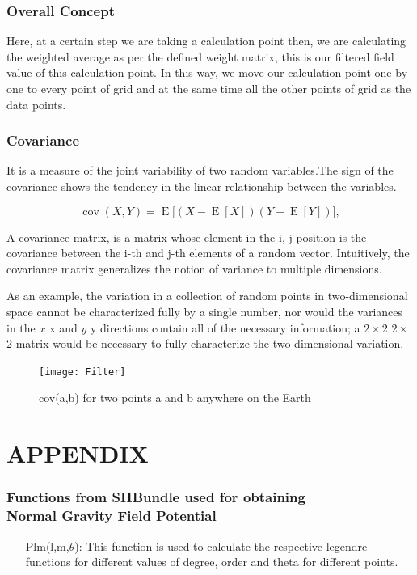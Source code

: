 \documentclass[a4paper,12pt]{report}
\begin{document}
\subsection{Overall Concept}
 Here, at a certain step we are taking a calculation point then, we are calculating the weighted average as per the defined weight matrix, this is our filtered field value of this calculation point. In this way, we move our calculation point one by one to every point of grid and at the same time all the other points of grid as the data points.     
 
 
\subsection{Covariance}
It is a measure of the joint variability of two random variables.The sign of the covariance shows the tendency in the linear relationship between the variables.
 

$$
{\displaystyle \operatorname {cov} (X,Y)=\operatorname {E} {{\big [}(X-\operatorname {E} [X])(Y-\operatorname {E} [Y]){\big ]}},} 
$$

 A covariance matrix, is a matrix whose element in the i, j position is the covariance between the i-th and j-th elements of a random vector.
 Intuitively, the covariance matrix generalizes the notion of variance to multiple dimensions.
 
 As an example, the variation in a collection of random points in two-dimensional space cannot be characterized fully by a single number, nor would the variances in the ${\displaystyle x}$ x and $ {\displaystyle y}$ y directions contain all of the necessary information; a ${\displaystyle 2\times 2}$ $ 2\times$ 2 matrix would be necessary to fully characterize the two-dimensional variation.

\begin{figure}[!h]
	\advance\leftskip-3cm
    \texttt{[image: Filter]}
    \caption{cov(a,b) for two points a and b anywhere on the Earth}
\end{figure}

\chapter{APPENDIX}

\subsection{Functions from SHBundle used for obtaining \\Normal Gravity Field Potential}
\begin{itemize}
	\item[Plm(l,m,$\theta$): ] This function is used to calculate the respective legendre functions for different values of degree, order and theta for different points.
\end{itemize}
\end{document}

